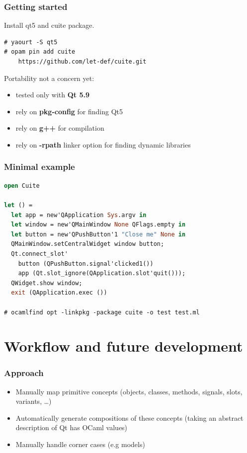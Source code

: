 \documentclass[serif,mathserif]{beamer}
\begin{document}
\begin{frame}[fragile]
  \frametitle{Getting started}

  Install qt5 and cuite package.

\begin{lstlisting}[]
# yaourt -S qt5
# opam pin add cuite 
    https://github.com/let-def/cuite.git
\end{lstlisting}

\pause
  Portability not a concern yet:

  \begin{itemize}
    \item tested only with {\bf Qt 5.9}
    \item rely on {\bf pkg-config} for finding Qt5
    \item rely on {\bf g++} for compilation
    \item rely on {\bf -rpath} linker option for finding dynamic libraries
  \end{itemize}
\end{frame}

\begin{frame}[fragile]
  \frametitle{Minimal example}

  \begin{lstlisting}[language=Caml,morekeywords={module,sig,end,val,new,open}]
open Cuite

let () =
  let app = new'QApplication Sys.argv in
  let window = new'QMainWindow None QFlags.empty in
  let button = new'QPushButton'1 "Close me" None in
  QMainWindow.setCentralWidget window button;
  Qt.connect_slot'
    button (QPushButton.signal'clicked1())
    app (Qt.slot_ignore(QApplication.slot'quit()));
  QWidget.show window;
  exit (QApplication.exec ())

# ocamlfind opt -linkpkg -package cuite -o test test.ml
  \end{lstlisting}

\end{frame}

\section{Workflow and future development}

\begin{frame}
  \frametitle{Approach}

  \begin{itemize}
    \item Manually map primitive concepts (objects, classes, methods, signals,
      slots, variants, \ldots)
      \pause
    \item Automatically generate compositions of these concepts (taking an
      abstract description of Qt has OCaml values)
      \pause
    \item Manually handle corner cases (e.g models)
  \end{itemize}

\end{frame}
\end{document}
